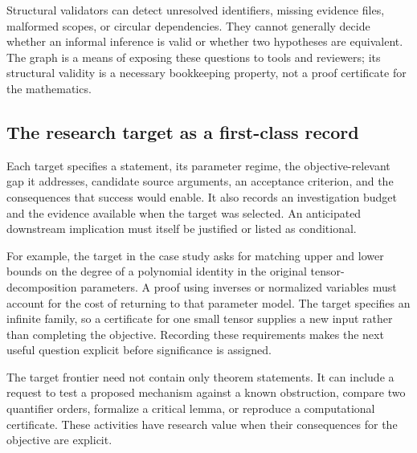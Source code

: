 Structural validators can detect unresolved identifiers, missing evidence files, malformed scopes, or circular dependencies. They cannot generally decide whether an informal inference is valid or whether two hypotheses are equivalent. The graph is a means of exposing these questions to tools and reviewers; its structural validity is a necessary bookkeeping property, not a proof certificate for the mathematics.

\subsection{The research target as a first-class record}

Each target specifies a statement, its parameter regime, the objective-relevant gap it addresses, candidate source arguments, an acceptance criterion, and the consequences that success would enable. It also records an investigation budget and the evidence available when the target was selected. An anticipated downstream implication must itself be justified or listed as conditional.

For example, the target in the case study asks for matching upper and lower bounds on the degree of a polynomial identity in the original tensor-decomposition parameters. A proof using inverses or normalized variables must account for the cost of returning to that parameter model. The target specifies an infinite family, so a certificate for one small tensor supplies a new input rather than completing the objective. Recording these requirements makes the next useful question explicit before significance is assigned.

The target frontier need not contain only theorem statements. It can include a request to test a proposed mechanism against a known obstruction, compare two quantifier orders, formalize a critical lemma, or reproduce a computational certificate. These activities have research value when their consequences for the objective are explicit.
